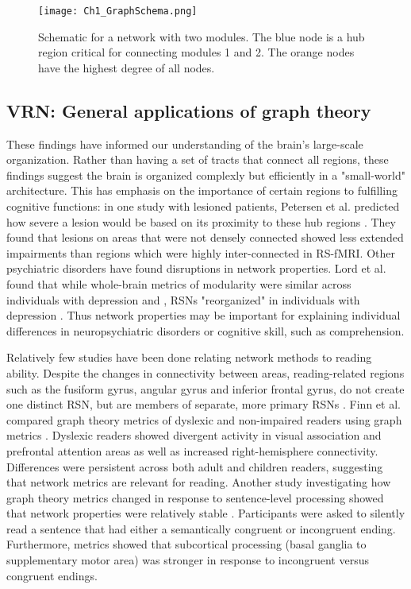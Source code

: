 \begin{figure}[t]
    \centering
    \texttt{[image: Ch1\_GraphSchema.png]}
    \caption[Schematic for a network with two modules.]{Schematic for a network with two modules. The blue node is a hub region critical for connecting modules 1 and 2. The orange nodes have the highest degree of all nodes.}
\end{figure}

\subsection{VRN: General applications of graph theory}

These findings have informed our understanding of the brain's large-scale organization. Rather than having a set of tracts that connect all regions, these findings suggest the brain is organized complexly but efficiently in a "small-world" architecture. This has emphasis on the importance of certain regions to fulfilling cognitive functions: in one study with lesioned patients, Petersen et al. predicted how severe a lesion would be based on its proximity to these hub regions \cite{Warren2014}. They found that lesions on areas that were not densely connected showed less extended impairments than regions which were highly inter-connected in RS-fMRI. Other psychiatric disorders have found disruptions in network properties. Lord et al. found that while whole-brain metrics of modularity were similar across individuals with depression and , RSNs "reorganized" in individuals with depression \cite{Lord2012}. Thus network properties may be important for explaining individual differences in neuropsychiatric disorders or cognitive skill, such as comprehension. 

Relatively few studies have been done relating network methods to reading ability. Despite the changes in connectivity between areas, reading-related regions such as the fusiform gyrus, angular gyrus and inferior frontal gyrus, do not create one distinct RSN, but are members of separate, more primary RSNs \cite{Vogel2013}. Finn et al. compared graph theory metrics of dyslexic and non-impaired readers using graph metrics \cite{Finn2014}. Dyslexic readers showed divergent activity in visual association and prefrontal attention areas as well as increased right-hemisphere connectivity. Differences were persistent across both adult and children readers, suggesting that network metrics are relevant for reading. Another study investigating how graph theory metrics changed in response to sentence-level processing showed that network properties were relatively stable \cite{Ye2012}. Participants were asked to silently read a sentence that had either a semantically congruent or incongruent ending. Furthermore, metrics showed that subcortical processing (basal ganglia to supplementary motor area) was stronger in response to incongruent versus congruent endings. 

